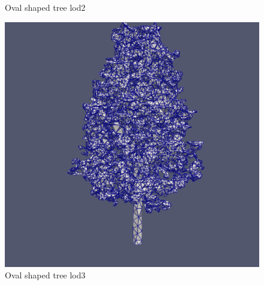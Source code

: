 \documentclass[12pt]{article}
\begin{document}
\begin{figure}[H]
\begin{minipage}{0.30\textwidth}
        \caption{Oval shaped tree lod2}
    \end{minipage}
    \begin{minipage}{0.30\textwidth}
        \centering
        \includegraphics[width=1\textwidth]{images/tree-oval_lod3.png}
        \caption{Oval shaped tree lod3}
    \end{minipage}
\end{figure}
\end{document}
